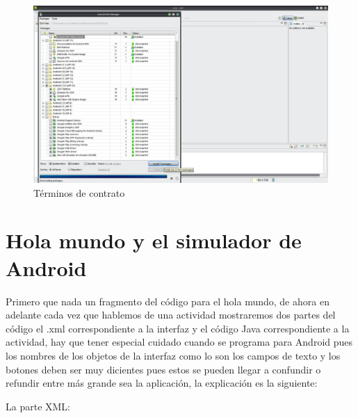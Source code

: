 \documentclass[11pt]{book}
\begin{document}
\begin{enumerate}[1.]
\begin{figure}[H]
  \centering
    \includegraphics[width=1.0\textwidth]{tutorial_9}
  \caption{Términos de contrato}
  \label{fig:tutorial_9}
\end{figure}
\end{enumerate}

\newpage
\section{Hola mundo y el simulador de Android}

Primero que nada un fragmento del código para el hola mundo, de ahora en adelante cada vez que hablemos de una actividad mostraremos dos partes del código el .xml correspondiente a la interfaz y el código Java correspondiente a la actividad, hay que tener especial cuidado cuando se programa para Android pues los nombres de los objetos de la interfaz como lo son los campos de texto y los botones deben ser muy dicientes pues estos se pueden llegar a confundir o refundir entre más grande sea la aplicación, la explicación es la siguiente:

La parte XML:
\end{document}
